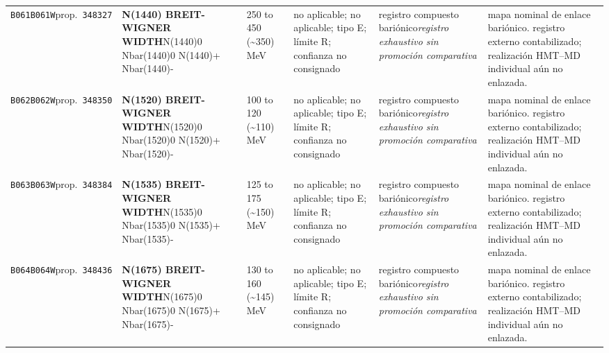 \begin{landscape}
\begin{longtable}{L{1.85cm}L{4.45cm}L{2.35cm}L{4.05cm}L{3.35cm}L{7.15cm}}
\texttt{B061}\newline \texttt{B061W}\newline prop.\ \texttt{348327} & \textbf{N(1440) BREIT-WIGNER WIDTH}\newline N(1440)0 \textbar{}\allowbreak{} Nbar(1440)0 \textbar{}\allowbreak{} N(1440)+ \textbar{}\allowbreak{} Nbar(1440)- & 250 to 450 (\textasciitilde{}350)\,MeV & no aplicable; no aplicable; tipo E; límite R; confianza no consignado & registro compuesto bariónico\newline \emph{registro exhaustivo sin promoción comparativa} & mapa nominal de enlace bariónico. registro externo contabilizado; realización HMT--MD individual aún no enlazada. \\
\texttt{B062}\newline \texttt{B062W}\newline prop.\ \texttt{348350} & \textbf{N(1520) BREIT-WIGNER WIDTH}\newline N(1520)0 \textbar{}\allowbreak{} Nbar(1520)0 \textbar{}\allowbreak{} N(1520)+ \textbar{}\allowbreak{} Nbar(1520)- & 100 to 120 (\textasciitilde{}110)\,MeV & no aplicable; no aplicable; tipo E; límite R; confianza no consignado & registro compuesto bariónico\newline \emph{registro exhaustivo sin promoción comparativa} & mapa nominal de enlace bariónico. registro externo contabilizado; realización HMT--MD individual aún no enlazada. \\
\texttt{B063}\newline \texttt{B063W}\newline prop.\ \texttt{348384} & \textbf{N(1535) BREIT-WIGNER WIDTH}\newline N(1535)0 \textbar{}\allowbreak{} Nbar(1535)0 \textbar{}\allowbreak{} N(1535)+ \textbar{}\allowbreak{} Nbar(1535)- & 125 to 175 (\textasciitilde{}150)\,MeV & no aplicable; no aplicable; tipo E; límite R; confianza no consignado & registro compuesto bariónico\newline \emph{registro exhaustivo sin promoción comparativa} & mapa nominal de enlace bariónico. registro externo contabilizado; realización HMT--MD individual aún no enlazada. \\
\texttt{B064}\newline \texttt{B064W}\newline prop.\ \texttt{348436} & \textbf{N(1675) BREIT-WIGNER WIDTH}\newline N(1675)0 \textbar{}\allowbreak{} Nbar(1675)0 \textbar{}\allowbreak{} N(1675)+ \textbar{}\allowbreak{} Nbar(1675)- & 130 to 160 (\textasciitilde{}145)\,MeV & no aplicable; no aplicable; tipo E; límite R; confianza no consignado & registro compuesto bariónico\newline \emph{registro exhaustivo sin promoción comparativa} & mapa nominal de enlace bariónico. registro externo contabilizado; realización HMT--MD individual aún no enlazada. \\

\end{longtable}
\end{landscape}
